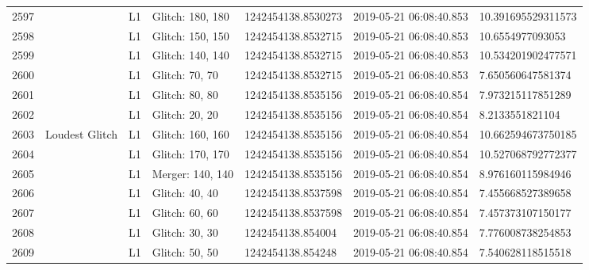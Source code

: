 \begin{longtable}{lllllll}
2597 &                                                    &       L1 &  Glitch: 180, 180 &  1242454138.8530273 &  2019-05-21 06:08:40.853 &  10.391695529311573 \\
2598 &                                                    &       L1 &  Glitch: 150, 150 &  1242454138.8532715 &  2019-05-21 06:08:40.853 &    10.6554977093053 \\
2599 &                                                    &       L1 &  Glitch: 140, 140 &  1242454138.8532715 &  2019-05-21 06:08:40.853 &  10.534201902477571 \\
2600 &                                                    &       L1 &    Glitch: 70, 70 &  1242454138.8532715 &  2019-05-21 06:08:40.853 &   7.650560647581374 \\
2601 &                                                    &       L1 &    Glitch: 80, 80 &  1242454138.8535156 &  2019-05-21 06:08:40.854 &   7.973215117851289 \\
2602 &                                                    &       L1 &    Glitch: 20, 20 &  1242454138.8535156 &  2019-05-21 06:08:40.854 &     8.2133551821104 \\
2603 &                                     Loudest Glitch &       L1 &  Glitch: 160, 160 &  1242454138.8535156 &  2019-05-21 06:08:40.854 &  10.662594673750185 \\
2604 &                                                    &       L1 &  Glitch: 170, 170 &  1242454138.8535156 &  2019-05-21 06:08:40.854 &  10.527068792772377 \\
2605 &                                                    &       L1 &  Merger: 140, 140 &  1242454138.8535156 &  2019-05-21 06:08:40.854 &   8.976160115984946 \\
2606 &                                                    &       L1 &    Glitch: 40, 40 &  1242454138.8537598 &  2019-05-21 06:08:40.854 &   7.455668527389658 \\
2607 &                                                    &       L1 &    Glitch: 60, 60 &  1242454138.8537598 &  2019-05-21 06:08:40.854 &   7.457373107150177 \\
2608 &                                                    &       L1 &    Glitch: 30, 30 &   1242454138.854004 &  2019-05-21 06:08:40.854 &   7.776008738254853 \\
2609 &                                                    &       L1 &    Glitch: 50, 50 &   1242454138.854248 &  2019-05-21 06:08:40.854 &   7.540628118515518 \\

\end{longtable}
